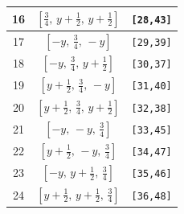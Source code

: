 \documentclass[fleqn,8pt]{jsarticle}
\begin{document}
\begin{longtable}{ccc}
16 & $\left[ \frac{3}{4},\, y + \frac{1}{2},\, y + \frac{1}{2} \right]$ & {\tt [28,43]} \\ \hline
17 & $\left[ - y,\, \frac{3}{4},\, - y \right]$ & {\tt [29,39]} \\ \hline
18 & $\left[ - y,\, \frac{3}{4},\, y + \frac{1}{2} \right]$ & {\tt [30,37]} \\ \hline
19 & $\left[ y + \frac{1}{2},\, \frac{3}{4},\, - y \right]$ & {\tt [31,40]} \\ \hline
20 & $\left[ y + \frac{1}{2},\, \frac{3}{4},\, y + \frac{1}{2} \right]$ & {\tt [32,38]} \\ \hline
21 & $\left[ - y,\, - y,\, \frac{3}{4} \right]$ & {\tt [33,45]} \\ \hline
22 & $\left[ y + \frac{1}{2},\, - y,\, \frac{3}{4} \right]$ & {\tt [34,47]} \\ \hline
23 & $\left[ - y,\, y + \frac{1}{2},\, \frac{3}{4} \right]$ & {\tt [35,46]} \\ \hline
24 & $\left[ y + \frac{1}{2},\, y + \frac{1}{2},\, \frac{3}{4} \right]$ & {\tt [36,48]} \\
\end{longtable}
\renewcommand{\arraystretch}{1.2}
\end{document}
